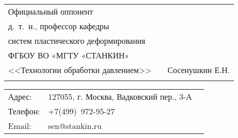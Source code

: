 \begin{center}
\begin{tabular}[c]{l m{3.1cm} r}

Официальный оппонент\\ д.~т.~н., профессор кафедры\\ систем пластического деформирования\\ ФГБОУ ВО «МГТУ «СТАНКИН»
 \\ <<Технологии обработки давлением>> & & Сосенушкин Е.Н. \\ 
  &   \\  

\end{tabular}
\end{center}

\begin{flushleft}
\begin{tabular}{l@{~}l@{~}l}
Адрес:  & 127055, г. Москва, Вадковский пер., 3-А \\
Телефон:    & +7(499)~972-95-27 \\
Email:    & sen@stankin.ru \\
\end{tabular}
\end{flushleft}

